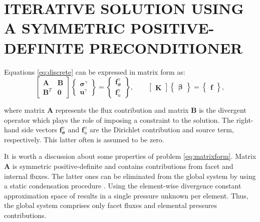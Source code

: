 \documentclass{wccm2024}
\begin{document}
\section{ITERATIVE SOLUTION USING A SYMMETRIC POSITIVE-DEFINITE PRECONDITIONER}

Equations \eqref{eq:discrete} can be expressed in matrix form as:
\vskip -0.3cm
\begin{equation} \label{eq:matrixform}
    \begin{bmatrix}
        \mathbf{A} & \mathbf{B} \\
        \mathbf{B}^T & \mathbf{0}
    \end{bmatrix}
    \begin{Bmatrix}
        \boldsymbol{\sigma}^\gamma \\
        \mathbf{u}^\gamma
    \end{Bmatrix}
    =
    \begin{Bmatrix}
        \mathbf{f}^\gamma_{\boldsymbol{\sigma}} \\
        \mathbf{f}^\gamma_{u}
    \end{Bmatrix}, \qquad
    \begin{bmatrix}
        \mathbf{K}
    \end{bmatrix}
    \begin{Bmatrix}
        \mathbf{\boldsymbol{\beta}}
    \end{Bmatrix}
    =
    \begin{Bmatrix}
        \mathbf{f}
    \end{Bmatrix},
\end{equation}

\noindent where matrix $\mathbf{A}$ represents the flux contribution and matrix $\mathbf{B}$ is the divergent operator which plays the role of imposing a constraint to the solution. The right-hand side vectors $\mathbf{f}^\gamma_{\boldsymbol{\sigma}}$ and $\mathbf{f}^\gamma_{u}$ are the Dirichlet contribution and source term, respectively. This latter often is assumed to be zero.

It is worth a discussion about some properties of problem \eqref{eq:matrixform}. Matrix $\mathbf{A}$ is symmetric positive-definite and contains contributions from facet and internal fluxes. The latter ones can be eliminated from the global system by using a static condensation procedure \cite{guyan1965reduction}. Using the element-wise divergence constant approximation space of \cite{devloo2022efficient} results in a single pressure unknown per element. Thus, the global system comprises only facet fluxes and elemental pressures contributions.
\end{document}
